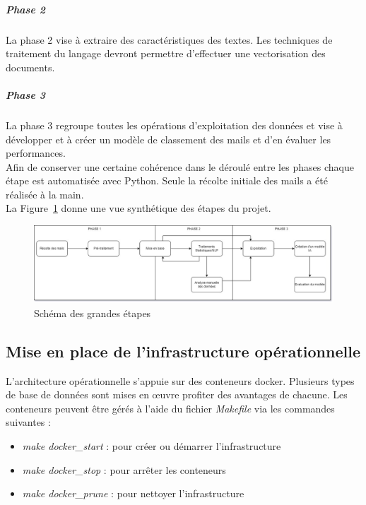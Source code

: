 \subparagraph{Phase 2}
	La phase 2 vise à extraire des caractéristiques des textes.
	Les techniques de traitement du langage devront permettre d'effectuer une vectorisation des documents.

\subparagraph{Phase 3} La phase 3 regroupe toutes les opérations d'exploitation des données et vise à développer et à créer un modèle de classement des mails et d'en évaluer les performances.\\

Afin de conserver une certaine cohérence dans le déroulé entre les phases chaque étape est automatisée avec Python.
Seule la récolte initiale des mails a été réalisée à la main.\\

La Figure~\ref{fig:SchemaGeneral} donne une vue synthétique des étapes du projet.
\begin{figure}[H]
	\includegraphics[width=\linewidth]{img/SchemaGeneral}
	\caption{Schéma des grandes étapes}
	\label{fig:SchemaGeneral}
\end{figure}

\subsection*{Mise en place de l'infrastructure opérationnelle}
	L'architecture opérationnelle s'appuie sur des conteneurs docker.
	Plusieurs types de base de données sont mises en œuvre profiter des avantages de chacune.
	Les conteneurs peuvent être gérés à l'aide du fichier \emph{Makefile} via les commandes suivantes :
	\begin{itemize}
		\item \emph{make docker\_start} : pour créer ou démarrer l'infrastructure
		\item \emph{make docker\_stop} : pour arrêter les conteneurs
		\item \emph{make docker\_prune} : pour nettoyer l'infrastructure
	\end{itemize}

